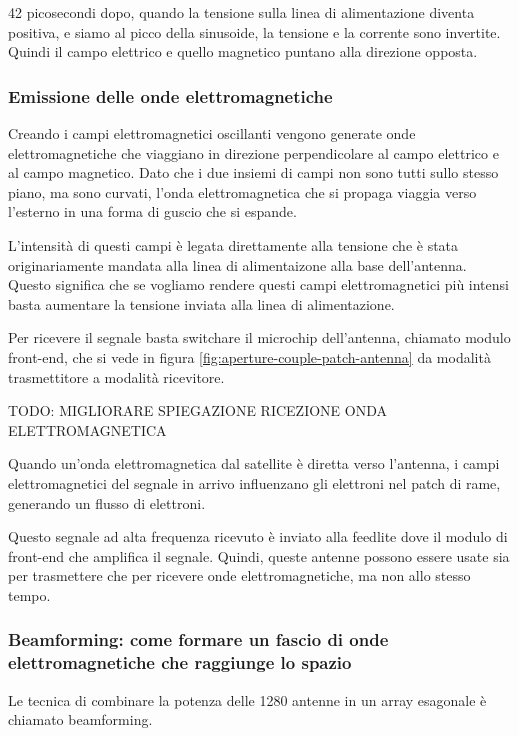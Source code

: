 42 picosecondi dopo, quando la tensione sulla linea di alimentazione diventa positiva, e siamo al picco della sinusoide, la tensione e la corrente sono invertite.
Quindi il campo elettrico e quello magnetico puntano alla direzione opposta.

\subsubsection{Emissione delle onde elettromagnetiche}
Creando i campi elettromagnetici oscillanti vengono generate onde elettromagnetiche che viaggiano in direzione perpendicolare al campo elettrico e al campo magnetico.
Dato che i due insiemi di campi non sono tutti sullo stesso piano, ma sono curvati, l'onda elettromagnetica che si propaga viaggia verso l'esterno in una forma di guscio che si espande.

L'intensità di questi campi è legata direttamente alla tensione che è stata originariamente mandata alla linea di alimentaizone alla base dell'antenna.
Questo significa che se vogliamo rendere questi campi elettromagnetici più intensi basta aumentare la tensione inviata alla linea di alimentazione.

Per ricevere il segnale basta switchare il microchip dell'antenna, chiamato modulo front-end, che si vede in figura \ref{fig:aperture-couple-patch-antenna} da modalità trasmettitore a modalità ricevitore.

TODO: MIGLIORARE SPIEGAZIONE RICEZIONE ONDA ELETTROMAGNETICA

Quando un'onda elettromagnetica dal satellite è diretta verso l'antenna, i campi elettromagnetici del segnale in arrivo influenzano gli elettroni nel patch di rame, generando un flusso di elettroni.

Questo segnale ad alta frequenza ricevuto è inviato alla feedlite dove il modulo di front-end che amplifica il segnale.
Quindi, queste antenne possono essere usate sia per trasmettere che per ricevere onde elettromagnetiche, ma non allo stesso tempo.\cite{branch_education_how_2022}

\subsubsection{Beamforming: come formare un fascio di onde elettromagnetiche che raggiunge lo spazio}
Le tecnica di combinare la potenza delle 1280 antenne in un array esagonale è chiamato beamforming.

